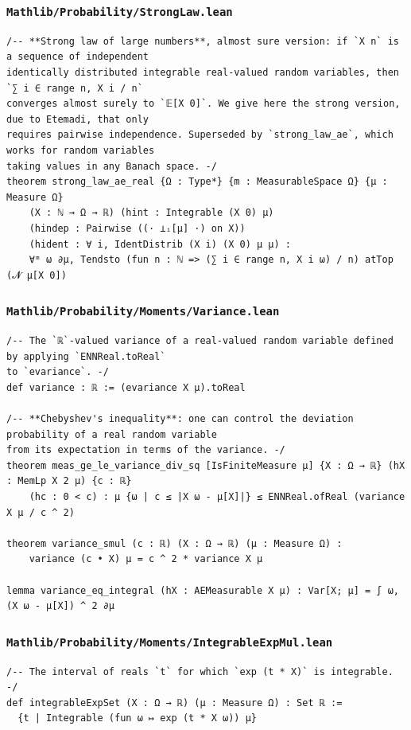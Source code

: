 \subsubsection{\texttt{Mathlib/Probability/StrongLaw.lean}}
\begin{lstlisting}[language=lean]
/-- **Strong law of large numbers**, almost sure version: if `X n` is a sequence of independent
identically distributed integrable real-valued random variables, then `∑ i ∈ range n, X i / n`
converges almost surely to `𝔼[X 0]`. We give here the strong version, due to Etemadi, that only
requires pairwise independence. Superseded by `strong_law_ae`, which works for random variables
taking values in any Banach space. -/
theorem strong_law_ae_real {Ω : Type*} {m : MeasurableSpace Ω} {μ : Measure Ω}
    (X : ℕ → Ω → ℝ) (hint : Integrable (X 0) μ)
    (hindep : Pairwise ((· ⟂ᵢ[μ] ·) on X))
    (hident : ∀ i, IdentDistrib (X i) (X 0) μ μ) :
    ∀ᵐ ω ∂μ, Tendsto (fun n : ℕ => (∑ i ∈ range n, X i ω) / n) atTop (𝓝 μ[X 0])
\end{lstlisting}

\newpage
\subsubsection{\texttt{Mathlib/Probability/Moments/Variance.lean}}
\begin{lstlisting}[language=lean]
/-- The `ℝ`-valued variance of a real-valued random variable defined by applying `ENNReal.toReal`
to `evariance`. -/
def variance : ℝ := (evariance X μ).toReal

/-- **Chebyshev's inequality**: one can control the deviation probability of a real random variable
from its expectation in terms of the variance. -/
theorem meas_ge_le_variance_div_sq [IsFiniteMeasure μ] {X : Ω → ℝ} (hX : MemLp X 2 μ) {c : ℝ}
    (hc : 0 < c) : μ {ω | c ≤ |X ω - μ[X]|} ≤ ENNReal.ofReal (variance X μ / c ^ 2)

theorem variance_smul (c : ℝ) (X : Ω → ℝ) (μ : Measure Ω) :
    variance (c • X) μ = c ^ 2 * variance X μ

lemma variance_eq_integral (hX : AEMeasurable X μ) : Var[X; μ] = ∫ ω, (X ω - μ[X]) ^ 2 ∂μ
\end{lstlisting}

\subsubsection{\texttt{Mathlib/Probability/Moments/IntegrableExpMul.lean}}
\begin{lstlisting}[language=lean]
/-- The interval of reals `t` for which `exp (t * X)` is integrable. -/
def integrableExpSet (X : Ω → ℝ) (μ : Measure Ω) : Set ℝ :=
  {t | Integrable (fun ω ↦ exp (t * X ω)) μ}
\end{lstlisting}

